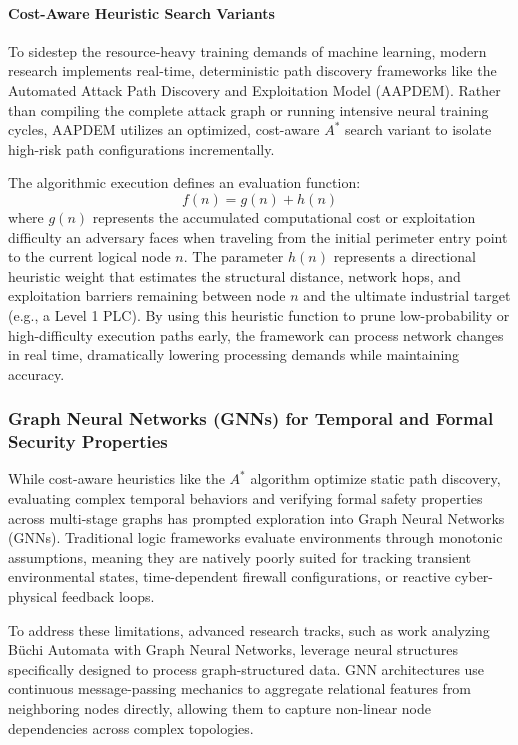 \documentclass[target=mst,aauheader=aics,style=]{thud}
\begin{document}
\paragraph{Cost-Aware Heuristic Search Variants}
To sidestep the resource-heavy training demands of machine learning, modern research implements real-time, deterministic path discovery frameworks like the Automated Attack Path Discovery and Exploitation Model (AAPDEM). Rather than compiling the complete attack graph or running intensive neural training cycles, AAPDEM utilizes an optimized, cost-aware $A^*$ search variant to isolate high-risk path configurations incrementally. 

The algorithmic execution defines an evaluation function:
\begin{equation}
f(n) = g(n) + h(n)
\end{equation}
where $g(n)$ represents the accumulated computational cost or exploitation difficulty an adversary faces when traveling from the initial perimeter entry point to the current logical node $n$. The parameter $h(n)$ represents a directional heuristic weight that estimates the structural distance, network hops, and exploitation barriers remaining between node $n$ and the ultimate industrial target (e.g., a Level 1 PLC). By using this heuristic function to prune low-probability or high-difficulty execution paths early, the framework can process network changes in real time, dramatically lowering processing demands while maintaining accuracy. 

\subsubsection{Graph Neural Networks (GNNs) for Temporal and Formal Security Properties}
While cost-aware heuristics like the $A^*$ algorithm optimize static path discovery, evaluating complex temporal behaviors and verifying formal safety properties across multi-stage graphs has prompted exploration into Graph Neural Networks (GNNs). Traditional logic frameworks evaluate environments through monotonic assumptions, meaning they are natively poorly suited for tracking transient environmental states, time-dependent firewall configurations, or reactive cyber-physical feedback loops. 

To address these limitations, advanced research tracks, such as work analyzing Büchi Automata with Graph Neural Networks, leverage neural structures specifically designed to process graph-structured data. GNN architectures use continuous message-passing mechanics to aggregate relational features from neighboring nodes directly, allowing them to capture non-linear node dependencies across complex topologies. 
\end{document}
